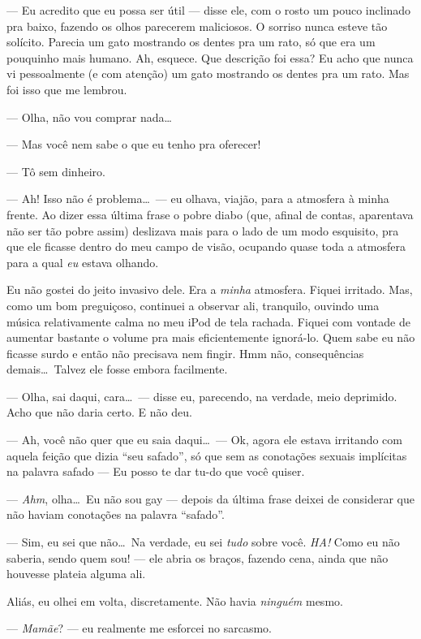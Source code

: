 --- Eu acredito que eu possa ser útil --- disse ele, com o rosto um pouco inclinado pra baixo, fazendo os olhos parecerem maliciosos. O sorriso nunca esteve tão solícito. Parecia um gato mostrando os dentes pra um rato, só que era um pouquinho mais humano. Ah, esquece. Que descrição foi essa? Eu acho que nunca vi pessoalmente (e com atenção) um gato mostrando os dentes pra um rato. Mas foi isso que me lembrou.

--- Olha, não vou comprar nada\ldots

--- Mas você nem sabe o que eu tenho pra oferecer!

--- Tô sem dinheiro.

--- Ah! Isso não é problema\ldots \ --- eu olhava, viajão, para a atmosfera à minha frente. Ao dizer essa última frase o pobre diabo (que, afinal de contas, aparentava não ser tão pobre assim) deslizava mais para o lado de um modo esquisito, pra que ele ficasse dentro do meu campo de visão, ocupando quase toda a atmosfera para a qual \emph{eu} estava olhando.

Eu não gostei do jeito invasivo dele. Era a \emph{minha} atmosfera. Fiquei irritado. Mas, como um bom preguiçoso, continuei a observar ali, tranquilo, ouvindo uma música relativamente calma no meu iPod de tela rachada. Fiquei com vontade de aumentar bastante o volume pra mais eficientemente ignorá-lo. Quem sabe eu não ficasse surdo e então não precisava nem fingir. Hmm não, consequências demais\ldots \ Talvez ele fosse embora facilmente.

--- Olha, sai daqui, cara\ldots \ --- disse eu, parecendo, na verdade, meio deprimido. Acho que não daria certo. E não deu.

--- Ah, você não quer que eu saia daqui\ldots \ --- Ok, agora ele estava irritando com aquela feição que dizia ``seu safado'', só que sem as conotações sexuais implícitas na palavra safado --- Eu posso te dar tu-do que você quiser.

--- \emph{Ahm}, olha\ldots \ Eu não sou gay --- depois da última frase deixei de considerar que não haviam conotações na palavra ``safado''.

--- Sim, eu sei que não\ldots \ Na verdade, eu sei \emph{tudo} sobre você. \emph{HA!} Como eu não saberia, sendo quem sou! --- ele abria os braços, fazendo cena, ainda que não houvesse plateia alguma ali.

Aliás, eu olhei em volta, discretamente. Não havia \emph{ninguém} mesmo.

--- \emph{Mamãe}? --- eu realmente me esforcei no sarcasmo.

